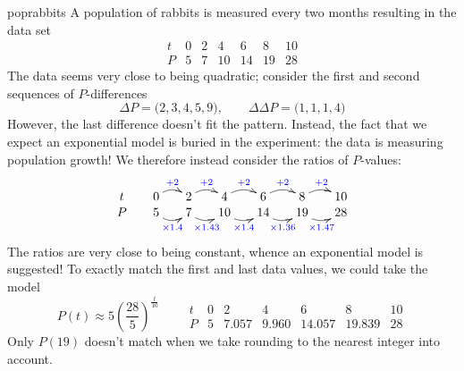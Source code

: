 \begin{example}{}{poprabbits}
	A population of rabbits is measured every two months resulting in the data set
	\[
		\begin{array}{c|cccccc}
			t&0&2&4&6&8&10\\\hline
			P&5&7&10&14&19&28
		\end{array}
	\]
	The data seems very close to being quadratic; consider the first and second sequences of $P$-differences
	\[
		\Delta P=\bigl(2,3,4,5,9\bigr),\qquad \Delta\Delta P=\bigl(1,1,1,4\bigr)
	\]
	However, the last difference doesn't fit the pattern. Instead, the fact that we expect an exponential model is buried in the experiment: the data is measuring population growth! We therefore instead consider the ratios of $P$-values:
	\[
		\xymatrix @R0pt @C15pt{
			t & 0 \ar@/^/[r]^{\textcolor{blue}{+2}} & 2 \ar@/^/[r]^{\textcolor{blue}{+2}} & 4 \ar@/^/[r]^{\textcolor{blue}{+2}} & 6 \ar@/^/[r]^{\textcolor{blue}{+2}} & 8 \ar@/^/[r]^{\textcolor{blue}{+2}} & 10\\
			P & 5 \ar@/_/[r]_{\textcolor{blue}{\times 1.4}} & 7 \ar@/_/[r]_{\textcolor{blue}{\times 1.43}} & 10 \ar@/_/[r]_{\textcolor{blue}{\times 1.4}} & 14 \ar@/_/[r]_{\textcolor{blue}{\times 1.36}} & 19 \ar@/_/[r]_{\textcolor{blue}{\times 1.47}} & 28
		}
	\]
	The ratios are very close to being constant, whence an exponential model is suggested! To exactly match the first and last data values, we could take the model
	\[
		P(t)\approx 5\left(\frac{28}5\right)^{\frac t{10}}\qquad
		\begin{array}{c|cccccc}
			t&0&2&4&6&8&10\\\hline
			P&5&7.057&9.960&14.057&19.839&28
		\end{array}
	\]
	Only $P(19)$ doesn't match when we take rounding to the nearest integer into account.
\end{example}


